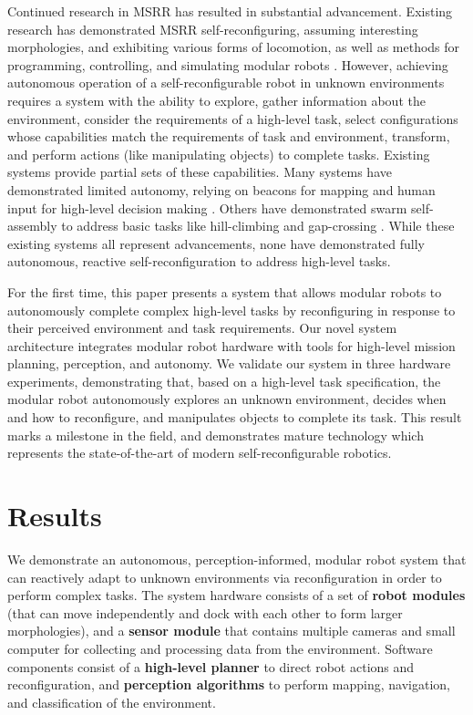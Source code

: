 \documentclass[12pt]{article}
\begin{document}
Continued research in  MSRR has resulted in substantial advancement.  Existing research has demonstrated MSRR self-reconfiguring, assuming interesting morphologies, and exhibiting various forms of locomotion, as well as methods for programming, controlling, and simulating modular robots \cite{Yim2007, Rubenstein2004,Murata2006,Paulos2015,Yim1994,Jing2016}.
However, achieving autonomous operation of a self-reconfigurable robot in unknown environments requires a system with the ability to explore, gather information about the environment, consider the requirements of a high-level task, select configurations whose capabilities match the requirements of task and environment, transform, and perform actions (like manipulating objects) to complete tasks.  Existing systems provide partial sets of these capabilities.
Many systems have demonstrated limited autonomy, relying on beacons for mapping  \cite{Grabowski2000,Dorigo2005} and human input for high-level decision making \cite{Mondada2005,Dorigo2013}. Others have demonstrated swarm self-assembly to address basic tasks like hill-climbing and gap-crossing \cite{gross2006autonomous,o2010self}.  While these existing systems all represent advancements, none have demonstrated fully autonomous, reactive self-reconfiguration to address high-level tasks.

For the first time, this paper presents a system that allows modular robots to autonomously complete complex high-level tasks by reconfiguring in response to their perceived environment and task requirements.  Our novel system architecture integrates modular robot hardware with tools for high-level mission planning, perception, and autonomy.  
We validate our system in three hardware experiments, demonstrating that, based on a high-level task specification, the modular robot autonomously explores an unknown environment, decides when and how to reconfigure, and manipulates objects to complete its task.  This result marks a milestone in the field, and demonstrates mature technology which represents the state-of-the-art of modern self-reconfigurable robotics.


\section{Results}
\label{sec:results}
%
We demonstrate an autonomous, perception-informed, modular robot system that can reactively adapt to unknown environments via reconfiguration in order to perform complex tasks. The system hardware consists of a set of \textbf{robot modules} (that can move independently and dock with each other to form larger morphologies), and a \textbf{sensor module} that contains multiple cameras and small computer for collecting and processing data from the environment. Software components consist of a \textbf{high-level planner} to direct robot actions and reconfiguration, and \textbf{perception algorithms} to perform mapping, navigation, and classification of the environment.
\end{document}
